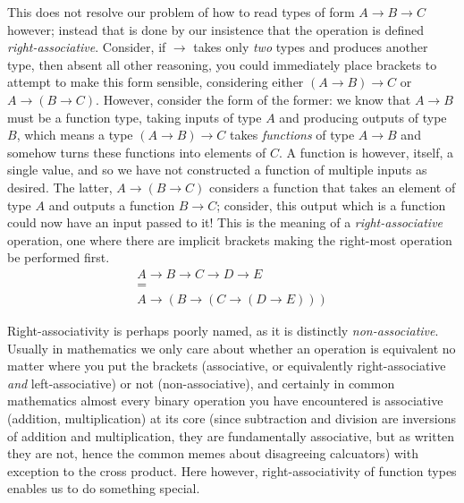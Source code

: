 \documentclass[11pt]{article}
\begin{document}
This does not resolve our problem of how to read types of form $A \to B \to C$ however; instead that is done by our insistence that the operation is defined \emph{right-associative}. Consider, if $\to$ takes only \emph{two} types and produces another type, then absent all other reasoning, you could immediately place brackets to attempt to make this form sensible, considering either $(A \to B) \to C$ or $A \to (B \to C)$. However, consider the form of the former: we know that $A \to B$ must be a function type, taking inputs of type $A$ and producing outputs of type $B$, which means a type $(A \to B) \to C$ takes \emph{functions} of type $A \to B$ and somehow turns these functions into elements of $C$. A function is however, itself, a single value, and so we have not constructed a function of multiple inputs as desired. The latter, $A \to (B \to C)$ considers a function that takes an element of type $A$ and outputs a function $B \to C$; consider, this output which is a function could now have an input passed to it! This is the meaning of a \emph{right-associative} operation, one where there are implicit brackets making the right-most operation be performed first. \begin{gather*}
A \to B \to C \to D \to E \\
= \\
A \to (B \to (C \to (D \to E)))
\end{gather*}

Right-associativity is perhaps poorly named, as it is distinctly \emph{non-associative}. Usually in mathematics we only care about whether an operation is equivalent no matter where you put the brackets (associative, or equivalently right-associative \emph{and} left-associative) or not (non-associative), and certainly in common mathematics almost every binary operation you have encountered is associative (addition, multiplication) at its core (since subtraction and division are inversions of addition and multiplication, they are fundamentally associative, but as written they are not, hence the common memes about disagreeing calcuators) with exception to the cross product. Here however, right-associativity of function types enables us to do something special.
\end{document}
